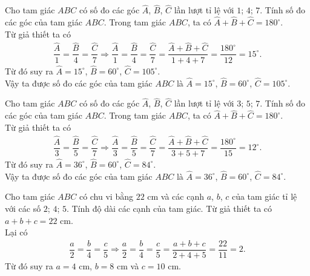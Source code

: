 \begin{bt}%
 Cho tam giác $ABC$ có số đo các góc $\widehat{A}$, $\widehat{B}$, $\widehat{C}$ lần lượt tỉ lệ với $1$; $4$; $7$. Tính số đo các góc của tam giác $ABC$.
 \loigiai
  {
  Trong tam giác $ABC$, ta có $\widehat{A}+\widehat{B}+\widehat{C}=180^\circ$.\\
  Từ giả thiết ta có
  \begin{eqnarray*}
  	\dfrac{\widehat{A}}{1} = \dfrac{\widehat{B}}{4} = \dfrac{\widehat{C}}{7} \Rightarrow \dfrac{\widehat{A}}{1} = \dfrac{\widehat{B}}{4} = \dfrac{\widehat{C}}{7} = \dfrac{\widehat{A}+\widehat{B}+\widehat{C}}{1+4+7} = \dfrac{180^\circ}{12} = 15^\circ.
  \end{eqnarray*}
  Từ đó suy ra $\widehat{A}=15^\circ$, $\widehat{B}=60^\circ$, $\widehat{C}=105^\circ$.\\
  Vậy ta được số đo các góc của tam giác $ABC$ là $\widehat{A}=15^\circ$, $\widehat{B}=60^\circ$, $\widehat{C}=105^\circ$.
  }
\end{bt}

\begin{bt}%
 Cho tam giác $ABC$ có số đo các góc $\widehat{A}$, $\widehat{B}$, $\widehat{C}$ lần lượt tỉ lệ với $3$; $5$; $7$. Tính số đo các góc của tam giác $ABC$.
 \loigiai
  {
  Trong tam giác $ABC$, ta có $\widehat{A}+\widehat{B}+\widehat{C}=180^\circ$.\\
  Từ giả thiết ta có
  \begin{eqnarray*}
   \dfrac{\widehat{A}}{3} = \dfrac{\widehat{B}}{5} = \dfrac{\widehat{C}}{7} \Rightarrow \dfrac{\widehat{A}}{3} = \dfrac{\widehat{B}}{5} = \dfrac{\widehat{C}}{7} = \dfrac{\widehat{A}+\widehat{B}+\widehat{C}}{3+5+7} = \dfrac{180^\circ}{15} = 12^\circ.
  \end{eqnarray*}
  Từ đó suy ra $\widehat{A}=36^\circ$, $\widehat{B}=60^\circ$, $\widehat{C}=84^\circ$.\\
  Vậy ta được số đo các góc của tam giác $ABC$ là $\widehat{A}=36^\circ$, $\widehat{B}=60^\circ$, $\widehat{C}=84^\circ$.
}
\end{bt}

\begin{bt}%
 Cho tam giác $ABC$ có chu vi bằng $22$ cm và các cạnh $a$, $b$, $c$ của tam giác tỉ lệ với các số $2$; $4$; $5$. Tính độ dài các cạnh của tam giác.
 \loigiai
  {
  Từ giả thiết ta có $a+b+c=22$ cm.\\
  Lại có
  \begin{eqnarray*}
  	\dfrac{a}{2} = \dfrac{b}{4} = \dfrac{c}{5} \Rightarrow \dfrac{a}{2}=\dfrac{b}{4} = \dfrac{c}{5}=\dfrac{a+b+c}{2+4+5}= \dfrac{22}{11} = 2.
  \end{eqnarray*}
  Từ đó suy ra $a=4$ cm, $b=8$ cm và $c=10$ cm.
  }
\end{bt}

